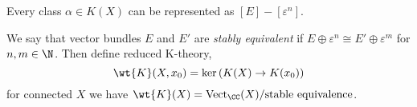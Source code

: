 \documentclass[12pt]{extarticle}
\begin{document}
\begin{prop}
Every class $\alpha \in K(X)$ can be represented as $[E] - [\varepsilon^n]$. 
\end{prop}

\begin{prop}

\end{prop}

\begin{defn}
We say that vector bundles $E$ and $E'$ are \textit{stably equivalent} if $E \oplus \varepsilon^n \cong E' \oplus \varepsilon^{m}$ for $n,m \in \N$. Then define reduced K-theory,
\[ \wt{K}(X, x_0) = \ker{(K(X) \to K(x_0))} \]
for connected $X$ we have $\wt{K}(X) = \mathrm{Vect}_{\CC}(X) / \text{stable equivalence}$. 
\end{defn}

\newcommand{\rk}{\mathrm{rk}}
\end{document}
